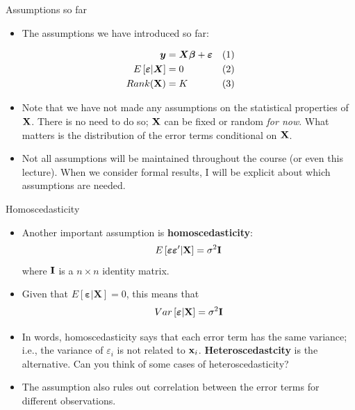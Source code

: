 \documentclass[english,xcolor={dvipsnames},aspectratio=169]{beamer}
\begin{document}
\begin{frame}{Assumptions so far}
\begin{itemize}
	\item The assumptions we have introduced so far:
\end{itemize}

\begin{align*}
\boldsymbol{y} & =  \boldsymbol{X}\boldsymbol{\beta}+\boldsymbol{\varepsilon}	& (1)\\
E\left[\boldsymbol{\varepsilon}|\boldsymbol{X}\right] & =  0						& (2) \\
Rank({\bf X}) & = K 	& (3)
\end{align*}

\begin{itemize}
	\item Note that we have not made any assumptions on the statistical properties of ${\bf X}$.
	There is no need to do so; ${\bf X}$ can be fixed or random \emph{for now}. What matters
	is the distribution of the error terms conditional on  ${\bf X}$.

	\item Not all assumptions will be maintained throughout the course (or even this lecture).
	When we consider formal results, I will be explicit about which assumptions are needed. 
	
\end{itemize}
\end{frame}

\begin{frame}{Homoscedasticity}
\begin{itemize}
	\item Another important assumption is {\bf homoscedasticity}:\[
		E\left[\boldsymbol{\varepsilon} \boldsymbol{\varepsilon}' | {\bf X} \right] = \sigma^{2} {\bf I}
	\]
	where ${\bf I}$ is a  $n \times n$ identity matrix.

	\medskip
	\item Given that $E\left[\boldsymbol{\varepsilon}|\boldsymbol{X}\right] =  0$, this means that\[
	Var\left[\boldsymbol{\varepsilon} | {\bf X} \right] = \sigma^{2} {\bf I}
	\]

	\item In words, homoscedasticity says that each error term has the same variance; i.e.,   
	the variance of $\varepsilon_i$ is not related to ${\bf x}_i$. {\bf Heteroscedastcity}
	is the alternative. Can you think of some cases of heteroscedasticity? 

	\item The assumption also rules out correlation between the error terms for different observations.
	
\end{itemize}
\end{frame}
\end{document}

